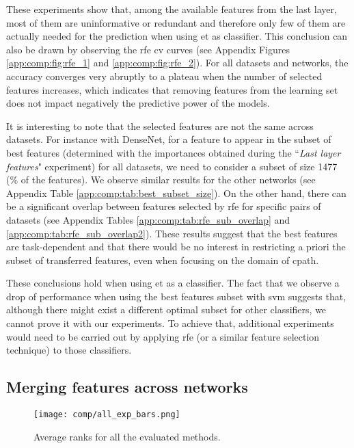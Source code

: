 These experiments show that, among the available features from the last layer, most of them are uninformative or redundant and therefore only few of them are actually needed for the prediction when using \acrshort{et} as classifier. This conclusion can also be drawn by observing the \acrlong{rfe} \acrlong{cv} curves (see Appendix Figures \ref{app:comp:fig:rfe_1} and 
\ref{app:comp:fig:rfe_2}). For all datasets and networks, the accuracy converges very abruptly to a plateau when the number of selected features increases, which indicates that removing features from the learning set does not impact negatively the predictive power of the models.

It is interesting to note that the selected features are not the same across datasets. For instance with DenseNet, for a feature to appear in the subset of best features (determined with the importances obtained during the ``\textit{Last layer features}" experiment) for all datasets, we need to consider a subset of size 1477 (\% of the features). We observe similar results for the other networks (see Appendix Table \ref{app:comp:tab:best_subset_size}). On the other hand, there can be a significant overlap between features selected by \acrshort{rfe} for specific pairs of datasets (see Appendix Tables \ref{app:comp:tab:rfe_sub_overlap} and \ref{app:comp:tab:rfe_sub_overlap2}). These results suggest that the best features are task-dependent and that there would be no interest in restricting a priori the subset of transferred features, even when focusing on the domain of \acrlong{cpath}. 

These conclusions hold when using \acrshort{et} as a classifier. The fact that we observe a drop of performance when using the best features subset with \acrshort{svm} suggests that, although there might exist a different optimal subset for other classifiers, we cannot prove it with our experiments. To achieve that, additional experiments would need to be carried out by applying \acrshort{rfe} (or a similar feature selection technique) to those classifiers.


\subsection{Merging features across networks}
\label{ssec:comp:exp_merge_net}

\begin{figure}
    \centering 
    \texttt{[image: comp/all\_exp\_bars.png]}
    \caption{Average ranks for all the evaluated methods.}
    \label{fig:comp:res_avg_ranks_all_methods}
\end{figure}

